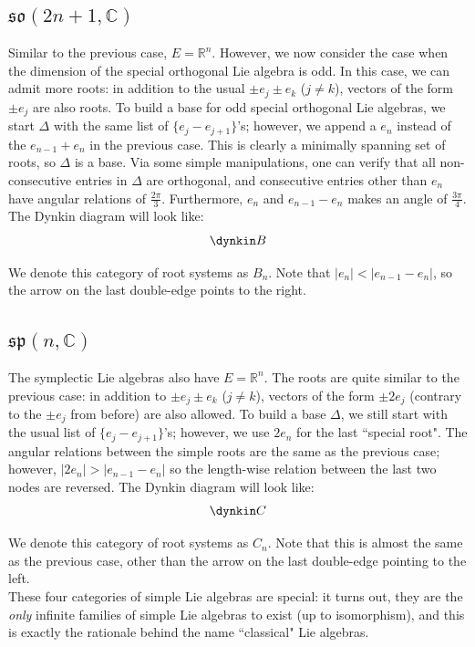 \documentclass{article}
\theoremstyle{definition}
\begin{document}
\subsection{$\mathfrak{so}(2n+1,\mathbb{C})$}
\quad Similar to the previous case, $E=\mathbb{R}^n$. However, we now consider the case when the dimension of the special orthogonal Lie algebra is odd. In this case, we can admit more roots: in addition to the usual $\pm e_j \pm e_k$ ($j\neq k$), vectors of the form $\pm e_j$ are also roots. To build a base for odd special orthogonal Lie algebras, we start $\Delta$ with the same list of $\{e_j-e_{j+1}\}$'s; however, we append a $e_n$ instead of the $e_{n-1}+e_n$ in the previous case. This is clearly a minimally spanning set of roots, so $\Delta$ is a base. Via some simple manipulations, one can verify that all non-consecutive entries in $\Delta$ are orthogonal, and consecutive entries other than $e_n$ have angular relations of $\frac{2\pi}{3}$. Furthermore, $e_n$ and $e_{n-1}-e_n$ makes an angle of $\frac{3\pi}{4}$. The Dynkin diagram will look like: 
$$\dynkin B{}$$

We denote this category of root systems as $B_n$. Note that $|e_n|<|e_{n-1}-e_n|$, so the arrow on the last double-edge points to the right. 
\subsection{$\mathfrak{sp}(n,\mathbb{C})$}
\quad The symplectic Lie algebras also have $E=\mathbb{R}^n$. The roots are quite similar to the previous case: in addition to $\pm e_j \pm e_k$ ($j\neq k$), vectors of the form $\pm2e_j$ (contrary to the $\pm e_j$ from before) are also allowed. To build a base $\Delta$, we still start with the usual list of $\{e_j-e_{j+1}\}$'s; however, we use $2e_n$ for the last ``special root". The angular relations between the simple roots are the same as the previous case; however, $|2e_n|>|e_{n-1}-e_n|$ so the length-wise relation between the last two nodes are reversed. The Dynkin diagram will look like: 
$$\dynkin C{}$$

We denote this category of root systems as $C_n$. Note that this is almost the same as the previous case, other than the arrow on the last double-edge pointing to the left. \\

These four categories of simple Lie algebras are special: it turns out, they are the \textit{only} infinite families of simple Lie algebras to exist (up to isomorphism), and this is exactly the rationale behind the name ``classical" Lie algebras. 
\end{document}
